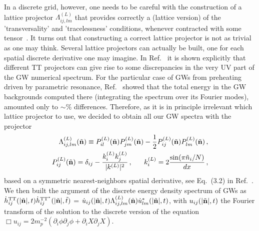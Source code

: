 \documentclass[a4paper,11pt]{article}
\begin{document}
In a discrete grid, however, one needs to be careful with the construction of a lattice projector $\Lambda_{ij,lm}^{(L)}$ that provides correctly a (lattice version) of the 'transversality' and 'tracelessness' conditions, whenever contracted with some tensor~\cite{Huang:2011gf,Figueroa:2011ye}. It turns out that constructing a correct lattice projector is not as trivial as one may think. Several lattice projectors can actually be built, one for each spatial discrete derivative one may imagine. In Ref.~\cite{Figueroa:2011ye} it is shown explicitly that different TT projectors can give rise to some discrepancies in the very UV part of the GW numerical spectrum. For the particular case of GWs from preheating driven by parametric resonance, Ref.~\cite{Figueroa:2011ye} showed that the total energy in the GW backgrounds computed there (integrating the spectrum over its Fourier modes), amounted only to $\sim \%$ differences. Therefore, as it is in principle irrelevant which lattice projector to use, we decided to obtain all our GW spectra with the projector
\begin{eqnarray}
\Lambda_{ij,lm}^{(L)}(\tilde{\bf n}) \equiv P^{(L)}_{il}(\tilde{\bf n})P^{(L)}_{jm}(\tilde{\bf n})-\frac{1}{2}P^{(L)}_{ij}(\tilde{\bf n})P^{(L)}_{lm}(\tilde{\bf n})\,,\\
P^{(L)}_{ij}(\tilde{\bf n}) = \delta_{ij} - \frac{k^{(L)}_{i}k^{(L)}_{j}}{|k^{(L)}|^2}\,,~~~~~ k^{(L)}_{i}= 
2\frac{\sin(\pi \tilde{n}_i/N)}{dx}\,,
\end{eqnarray}
based on a symmetric nearest-neighbors spatial derivative, see Eq.~(3.2) in Ref.~\cite{Figueroa:2011ye}. We then built the argument of the discrete energy density spectrum of GWs as ${{\dot h}_{ij}^{\rm TT}}(|\tilde{\bf n}|,t) {\dot h}_{ij}^{{\rm TT}^*}(|\tilde{\bf n}|,\tilde t)$ = ${\dot u}_{ij}(|\tilde{\bf n}|,t)\Lambda_{ij,lm}^{(L)}(\hat{\bf n}) {\dot u}_{lm}^{*}(|\tilde{\bf n}|,t)$, with $u_{ij}(|\tilde{\bf n}|,t)$ the Fourier transform of the solution to the discrete version of the equation $\Box u_{ij} = 2m_p^{-2}(\partial_i\phi\partial_j\phi + \partial_iX\partial_jX)$. 


\end{document}
